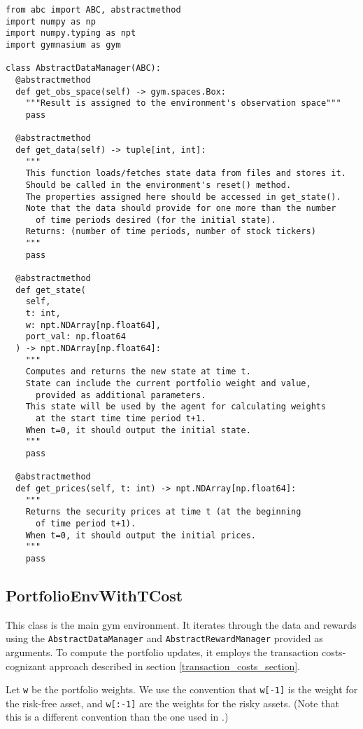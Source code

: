 \begin{verbatim}
from abc import ABC, abstractmethod
import numpy as np
import numpy.typing as npt
import gymnasium as gym

class AbstractDataManager(ABC):
  @abstractmethod
  def get_obs_space(self) -> gym.spaces.Box:
    """Result is assigned to the environment's observation space"""
    pass

  @abstractmethod
  def get_data(self) -> tuple[int, int]:
    """
    This function loads/fetches state data from files and stores it.
    Should be called in the environment's reset() method.
    The properties assigned here should be accessed in get_state().
    Note that the data should provide for one more than the number
      of time periods desired (for the initial state).
    Returns: (number of time periods, number of stock tickers)
    """
    pass

  @abstractmethod
  def get_state(
    self,
    t: int,
    w: npt.NDArray[np.float64],
    port_val: np.float64
  ) -> npt.NDArray[np.float64]:
    """
    Computes and returns the new state at time t.
    State can include the current portfolio weight and value,
      provided as additional parameters.
    This state will be used by the agent for calculating weights
      at the start time time period t+1.
    When t=0, it should output the initial state.
    """
    pass

  @abstractmethod
  def get_prices(self, t: int) -> npt.NDArray[np.float64]:
    """
    Returns the security prices at time t (at the beginning
      of time period t+1).
    When t=0, it should output the initial prices.
    """
    pass
  \end{verbatim}

\subsection{PortfolioEnvWithTCost}

This class is the main gym environment.
It iterates through the data and rewards using the \texttt{AbstractDataManager} and \texttt{AbstractRewardManager} provided as arguments.
To compute the portfolio updates, it employs the transaction costs-cognizant approach described in section \ref{transaction_costs_section}.

Let \texttt{w} be the portfolio weights. We use the convention that \texttt{w[-1]} is the weight for the risk-free asset,
and \texttt{w[:-1]} are the weights for the risky assets. (Note that this is a different convention than the one used in \cite{drl_framework}.)

